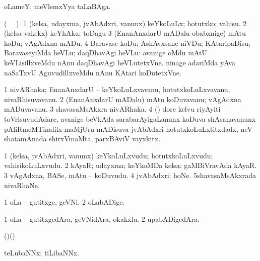{\bentry
{} 
\gl{\nA}
\expl{}
\bmng
 oLameY; meVlemxYya taLaBAga. 
\emng
\eentry

\bentry
{} 
\gl{\sakirx}
\expl{}
\bmng
 (\BU\  \BUkaq\ ). 
\bnum
\num{1} (kelsa, udayxma, jvAbAdxri, \mo vanunx) keYkoLuLx; hotutxko; vahisu. 
\num{2} (kelsa \mo vakekx) keYhAku; toDagu 
\num{3} (EnanAnxdarU mADalu obabxnige) mAtu koDu; vAgAdxna mADu. 
\num{4} Baravase koDu; AshAvxsane niVDu; KAtaripaDisu; BaravaseyiMda heVLu; daqDhavAgi heVLu:  avanige oMdu mAtU keVLisillxveMdu nAnu daqDhavAgi heVLutetxVne.  ninage adariMda yAva naSaTxvU AguvudillxveMdu nAnu KAtari koDutetxVne. 
\enum
\emng
\eentry

\bentry
{} 
\gl{\nA}
\expl{}
\bmng
\bnum
\num{1} nivARhaka; EnanAnxdarU -- keYkoLuLxvavanu, hotutxkoLuLxvavanu, nivaRhisuvavanu. 
\num{2} (EnanAnxdarU mADalu) mAtu koDuvavanu; vAgAdxna mADuvavanu. 
\num{3} shavasaMsAkxra nivARhaka. 
\num{4} (\ca) dore kelvu riyAyiti toVrisuvudAdare, avanige beVkAda sarabarAyigaLanunx koDuva shAsanavanunx pAliRmeMTinalilx maMjUru mADisuva jvAbAdxri hotutxkoLuLxtitxdadx, neV shatamAnada shirxVmaMta, parxBAviV vayxkitx. 
\enum
\emng
\eentry

\bentry
{} 
\gl{\nA}
\expl{}
\bmng
\bnum
\num{1} (kelsa, jvAbAdxri, \mo vanunx) keYkoLuLxvudu; hotutxkoLuLxvudu; vahisikoLuLxvudu. 
\num{2} kAyaR; udayxma; keYkoMDa kelsa:  gaMBiVravAda kAyaR. 
\num{3} vAgAdxna, BASe, mAtu -- koDuvudu. 
\num{4} jvAbAdxri; hoNe. 
\num{5}shavasaMsAkxrada nivaRhaNe. 
\enum
\emng
\eentry

\bentry
{} 
\gl{\nA}
\bmng
\bnum
\num{1} oLa -- gutitxge, geVNi. 
\num{2} oLabADige. 
\enum
\emng
\eentry

\bentry
{} 
\gl{\nA}
\expl{}
\bmng
\bnum
\num{1} oLa -- gutitxgedAra, geVNidAra, okakxlu. 
\num{2} upabADigedAra. 
\enum
\emng
\eentry

\bentry
{} 
\gl{\nA}
\expl{}
\bmng
 (\bava)(\AmA)  
\emng
\eentry

\bentry
{} 
\gl{\nA}
\expl{}
\bmng
 teLubaNNx; tiLibaNNx. 
\emng
\eentry

}
